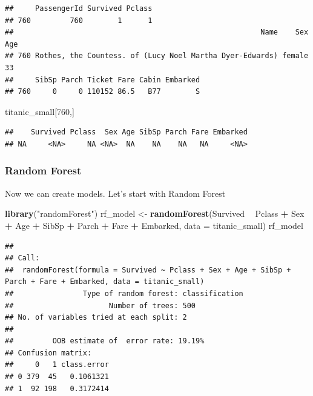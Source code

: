 \documentclass[]{krantz}
\newenvironment{Shaded}{\begin{snugshade}}{\end{snugshade}}
\newcommand{\DataTypeTok}[1]{\textcolor[rgb]{0.13,0.29,0.53}{#1}}
\newcommand{\DecValTok}[1]{\textcolor[rgb]{0.00,0.00,0.81}{#1}}
\newcommand{\KeywordTok}[1]{\textcolor[rgb]{0.13,0.29,0.53}{\textbf{#1}}}
\newcommand{\NormalTok}[1]{#1}
\newcommand{\OperatorTok}[1]{\textcolor[rgb]{0.81,0.36,0.00}{\textbf{#1}}}
\newcommand{\StringTok}[1]{\textcolor[rgb]{0.31,0.60,0.02}{#1}}
\theoremstyle{definition}
\theoremstyle{definition}
\theoremstyle{definition}
\theoremstyle{remark}
\begin{document}
\begin{verbatim}
##     PassengerId Survived Pclass
## 760         760        1      1
##                                                         Name    Sex Age
## 760 Rothes, the Countess. of (Lucy Noel Martha Dyer-Edwards) female  33
##     SibSp Parch Ticket Fare Cabin Embarked
## 760     0     0 110152 86.5   B77        S
\end{verbatim}

\begin{Shaded}
\begin{Highlighting}[]
\NormalTok{titanic_small[}\DecValTok{760}\NormalTok{,]}
\end{Highlighting}
\end{Shaded}

\begin{verbatim}
##    Survived Pclass  Sex Age SibSp Parch Fare Embarked
## NA     <NA>     NA <NA>  NA    NA    NA   NA     <NA>
\end{verbatim}

\hypertarget{random-forest}{%
\subsubsection{Random Forest}\label{random-forest}}

Now we can create models. Let's start with Random Forest

\begin{Shaded}
\begin{Highlighting}[]
\KeywordTok{library}\NormalTok{(}\StringTok{"randomForest"}\NormalTok{)}
\NormalTok{rf_model <-}\StringTok{ }\KeywordTok{randomForest}\NormalTok{(Survived }\OperatorTok{~}\StringTok{ }\NormalTok{Pclass }\OperatorTok{+}\StringTok{ }\NormalTok{Sex }\OperatorTok{+}\StringTok{ }\NormalTok{Age }\OperatorTok{+}\StringTok{ }\NormalTok{SibSp }\OperatorTok{+}\StringTok{ }
\StringTok{                           }\NormalTok{Parch }\OperatorTok{+}\StringTok{ }\NormalTok{Fare }\OperatorTok{+}\StringTok{ }\NormalTok{Embarked, }
                           \DataTypeTok{data =}\NormalTok{ titanic_small)}
\NormalTok{rf_model}
\end{Highlighting}
\end{Shaded}

\begin{verbatim}
## 
## Call:
##  randomForest(formula = Survived ~ Pclass + Sex + Age + SibSp +      Parch + Fare + Embarked, data = titanic_small) 
##                Type of random forest: classification
##                      Number of trees: 500
## No. of variables tried at each split: 2
## 
##         OOB estimate of  error rate: 19.19%
## Confusion matrix:
##     0   1 class.error
## 0 379  45   0.1061321
## 1  92 198   0.3172414
\end{verbatim}
\end{document}
